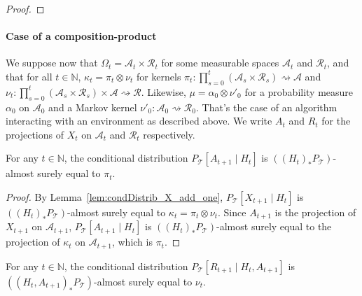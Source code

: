 \begin{proof}

\end{proof}


\paragraph{Case of a composition-product}

We suppose now that $\Omega_t = \mathcal{A}_t \times \mathcal{R}_t$ for some measurable spaces $\mathcal{A}_t$ and $\mathcal{R}_t$, and that for all $t \in \mathbb{N}$, $\kappa_t = \pi_t \otimes \nu_t$ for kernels $\pi_t : \prod_{s=0}^t(\mathcal{A}_s \times \mathcal{R}_s) \rightsquigarrow \mathcal{A}$ and $\nu_t : \prod_{s=0}^t(\mathcal{A}_s \times \mathcal{R}_s) \times \mathcal{A} \rightsquigarrow \mathcal{R}$.
Likewise, $\mu = \alpha_0 \otimes \nu'_0$ for a probability measure $\alpha_0$ on $\mathcal{A}_0$ and a Markov kernel $\nu'_0 : \mathcal{A}_0 \rightsquigarrow \mathcal{R}_0$.
That's the case of an algorithm interacting with an environment as described above.
We write $A_t$ and $R_t$ for the projections of $X_t$ on $\mathcal{A}_t$ and $\mathcal{R}_t$ respectively.

\begin{lemma}\label{lem:condDistrib_A_add_one}
For any $t \in \mathbb{N}$, the conditional distribution $P_{\mathcal{T}}\left[A_{t+1} \mid H_t\right]$ is $((H_t)_* P_{\mathcal{T}})$-almost surely equal to $\pi_t$.
\end{lemma}

\begin{proof}
By Lemma~\ref{lem:condDistrib_X_add_one}, $P_{\mathcal{T}}\left[X_{t+1} \mid H_t\right]$ is $((H_t)_* P_{\mathcal{T}})$-almost surely equal to $\kappa_t = \pi_t \otimes \nu_t$.
Since $A_{t+1}$ is the projection of $X_{t+1}$ on $\mathcal{A}_{t+1}$, $P_{\mathcal{T}}\left[A_{t+1} \mid H_t\right]$ is $((H_t)_* P_{\mathcal{T}})$-almost surely equal to the projection of $\kappa_t$ on $\mathcal{A}_{t+1}$, which is $\pi_t$.
\end{proof}


\begin{lemma}\label{lem:condDistrib_R_add_one}
For any $t \in \mathbb{N}$, the conditional distribution $P_{\mathcal{T}}\left[R_{t+1} \mid H_t, A_{t+1}\right]$ is $((H_t, A_{t+1})_* P_{\mathcal{T}})$-almost surely equal to $\nu_t$.
\end{lemma}

